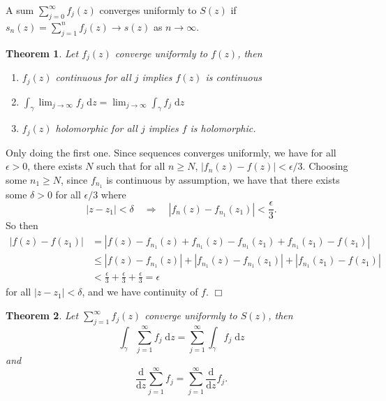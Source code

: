 \documentclass[letter-paper]{tufte-book}
\newtheorem{theorem}{\color{pastel-blue}Theorem}[section]
\newenvironment{proof}[1][Proof]{\begin{trivlist}
\item[\hskip \labelsep {\bfseries #1}]}{\end{trivlist}}
\newcommand{\qedwhite}{\hfill \ensuremath{\Box}}
\begin{document}
A sum $\sum_{j=0}^\infty f_j(z)$ converges uniformly to $S(z)$ if $s_n(z) =
\sum_{j=1}^n f_j(z) \to s(z)$ as $n\to\infty$.

\begin{theorem}
  Let $f_j(z)$ converge uniformly to $f(z)$, then
  \begin{enumerate}
    \item $f_j(z)$ continuous for all $j$ implies $f(z)$ is continuous
    \item $\int_\gamma \lim_{j\to\infty} f_j\; \mathrm{d}z = \lim_{j\to\infty} \int_\gamma f_j\; \mathrm{d}z$
    \item $f_j(z)$ holomorphic for all $j$ implies $f$ is holomorphic.
  \end{enumerate}
\end{theorem}

\begin{proof}
  Only doing the first one. Since sequences converges uniformly, we have for all
  $\epsilon > 0$, there exists $N$ such that for all $n\geq N$, $|f_n(z) - f(z)|
  < \epsilon / 3$. Choosing some $n_1 \geq N$, since $f_{n_1}$ is continuous by
  assumption, we have that there exists some $\delta > 0$ for all $\epsilon / 3$
  where
  \begin{equation*}
    |z - z_1| < \delta \quad \Rightarrow \quad |f_n(z) - f_{n_1}(z_1)| < \frac{\epsilon}{3}.
  \end{equation*}
  So then
  \begin{align*}
    |f(z) - f(z_1)| &= |f(z) - f_{n_1}(z) + f_{n_1}(z) - f_{n_1}(z_1) + f_{n_1}(z_1) - f(z_1)| \\
      &\leq |f(z) - f_{n_1}(z)| + |f_{n_1}(z) - f_{n_1}(z_1)| + |f_{n_1}(z_1) - f(z_1)| \\ 
      &< \frac{\epsilon}{3} + \frac{\epsilon}{3} + \frac{\epsilon}{3} = \epsilon
  \end{align*}
  for all $|z - z_1| < \delta$, and we have continuity of $f$. \qedwhite
\end{proof}

\begin{theorem}
  Let $\sum_{j=1}^\infty f_j(z)$ converge uniformly to $S(z)$, then
  \begin{equation*}
    \int_\gamma \sum_{j=1}^\infty f_j\; \mathrm{d}z = \sum_{j=1}^\infty \int_\gamma f_j\; \mathrm{d}z
  \end{equation*}
  and
  \begin{equation*}
    \frac{\mathrm{d}}{\mathrm{d}z} \sum_{j=1}^\infty f_j = \sum_{j=1}^\infty \frac{\mathrm{d}}{\mathrm{d}z} f_j.
  \end{equation*}
\end{theorem}
\end{document}
